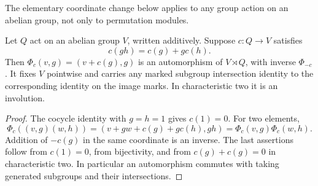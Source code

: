 The elementary coordinate change below applies to any group action on
an abelian group, not only to permutation modules.
\begin{lemma}\label{lem:shear}
Let $Q$ act on an abelian group $V$, written additively. Suppose
$c:Q\to V$ satisfies
\[
 c(gh)=c(g)+g c(h).
\]
Then $\Phi_c(v,g)=(v+c(g),g)$ is an automorphism of $V\rtimes Q$,
with inverse $\Phi_{-c}$. It fixes $V$ pointwise and carries any marked
subgroup intersection identity to the corresponding identity on the
image marks. In characteristic two it is an involution.
\end{lemma}
\begin{proof}
The cocycle identity with $g=h=1$ gives $c(1)=0$. For two elements,
\[
 \Phi_c((v,g)(w,h))=(v+gw+c(g)+gc(h),gh)
 =\Phi_c(v,g)\Phi_c(w,h).
\]
Addition of $-c(g)$ in the same coordinate is an inverse. The last
assertions follow from $c(1)=0$, from bijectivity, and from
$c(g)+c(g)=0$ in characteristic two. In particular an automorphism
commutes with taking generated subgroups and their intersections.
\end{proof}

